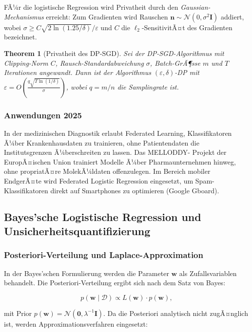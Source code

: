 ﻿\documentclass[12pt, a4paper]{article}
\newtheorem{theorem}{Theorem}[section]
\theoremstyle{definition}
\theoremstyle{remark}
\newcommand{\vw}{\bm{w}}
\begin{document}
FÃ¼r die logistische Regression wird Privatheit durch den \emph{Gaussian-Mechanismus} erreicht:
Zum Gradienten wird Rauschen $\bm{n} \sim \mathcal{N}(0, \sigma^2 \mathbf{I})$ addiert, wobei
$\sigma \geq C\sqrt{2\ln(1.25/\delta)}/\varepsilon$ und $C$ die $\ell_2$-SensitivitÃ¤t des
Gradienten bezeichnet.

\begin{theorem}[Privatheit des DP-SGD]
  Sei der DP-SGD-Algorithmus mit Clipping-Norm $C$, Rausch-Standardabweichung $\sigma$,
  Batch-GrÃ¶sse $m$ und $T$ Iterationen angewandt. Dann ist der Algorithmus
  $(\varepsilon, \delta)$-DP mit $\varepsilon = O\!\left(\frac{q\sqrt{T\ln(1/\delta)}}{\sigma}\right)$,
  wobei $q = m/n$ die Samplingrate ist.
\end{theorem}

\subsubsection{Anwendungen 2025}

In der medizinischen Diagnostik erlaubt Federated Learning, Klassifikatoren Ã¼ber Krankenhausdaten
zu trainieren, ohne Patientendaten die Institutsgrenzen Ã¼berschreiten zu lassen. Das MELLODDY-
Projekt der EuropÃ¤ischen Union trainiert Modelle Ã¼ber Pharmaunternehmen hinweg, ohne propriatÃ¤re
MolekÃ¼ldaten offenzulegen. Im Bereich mobiler EndgerÃ¤te wird Federated Logistic Regression
eingesetzt, um Spam-Klassifikatoren direkt auf Smartphones zu optimieren (Google Gboard).

\subsection{Bayes'sche Logistische Regression und Unsicherheitsquantifizierung}

\subsubsection{Posteriori-Verteilung und Laplace-Approximation}

In der Bayes'schen Formulierung werden die Parameter $\vw$ als Zufallsvariablen behandelt.
Die Posteriori-Verteilung ergibt sich nach dem Satz von Bayes:

\begin{equation}
  p(\vw \mid \mathcal{D}) \propto L(\vw) \cdot p(\vw),
  \label{eq:posterior}
\end{equation}

mit Prior $p(\vw) = \mathcal{N}(\mathbf{0}, \lambda^{-1}\mathbf{I})$. Da die Posteriori
analytisch nicht zugÃ¤nglich ist, werden Approximationsverfahren eingesetzt:
\end{document}
